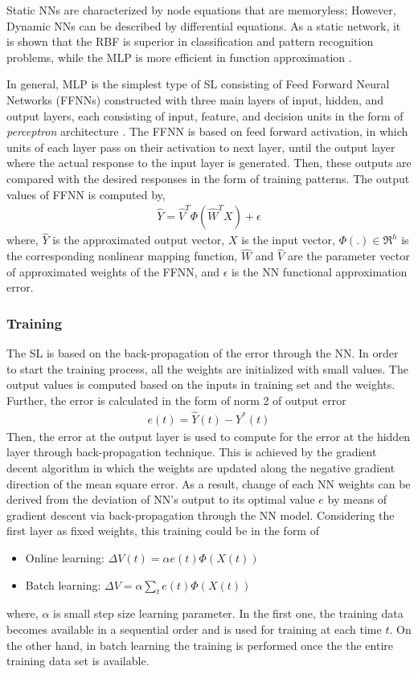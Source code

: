 \documentclass[journal]{IEEEtran}
\begin{document}
Static NNs are characterized by node equations that are memoryless; However, Dynamic NNs can be described by differential equations. As a static network, it is shown that the RBF is superior in classification and pattern recognition problems, while the MLP is more efficient in function approximation \cite{ 180705}. 

In general, MLP is the simplest type of SL consisting of Feed Forward Neural Networks (FFNNs) constructed with three main layers of input, hidden, and output layers, each consisting of input, feature, and decision units in the form of \textit{perceptron} architecture \cite{rosenblatt1958perceptron}. The FFNN is based on feed forward activation, in which units of each layer pass on their activation to next layer, until the output layer where the actual response to the input layer is generated. Then, these outputs are compared with the desired responses in the form of training patterns. The output values of FFNN is computed by,
\begin{eqnarray}
\hat{Y}=  \hat{V}^T \Phi(\hat{W}^TX)+\epsilon
\end{eqnarray}
where, $\hat{Y}$ is the approximated output vector, $X$ is the input vector, $\Phi(.) \in \Re^h$ is the corresponding nonlinear mapping function, $\hat{W}$ and $\hat{V}$ are the parameter vector of approximated weights of the FFNN, and $\epsilon$ is the NN functional approximation error. 


\subsubsection{Training}
The SL is based on the back-propagation of the error through the NN. In order to start the training process, all the weights are initialized with small values. The output values is computed based on the inputs in training set and the weights. Further, the  error is calculated in the form of norm 2 of output error
\begin{eqnarray}
e(t)=\hat{Y}(t)-Y^*(t)
\end{eqnarray}
Then, the error at the output layer is used to compute for the error at the hidden layer through  back-propagation technique. This is achieved by the gradient decent algorithm in which the weights are updated along the negative gradient direction of the mean square error. As a result, change of each NN weights can be derived from the deviation of NN's output to its optimal value $e$ by means of gradient descent via back-propagation through the NN model. Considering the first layer as fixed weights, this training could be in the form of 
\begin{itemize}
\item Online learning: $\Delta {V}(t)=\alpha e(t) \Phi(X(t))$
\item Batch learning: $\Delta {V}=\alpha \sum_t e(t) \Phi(X(t))$
\end{itemize}
where, $\alpha$ is small step size learning parameter. 
In the first one, the training data becomes available in a sequential order and is used for training at each time $t$. On the other hand, in batch learning the training is performed once the the entire training data set is available. 
\end{document}
